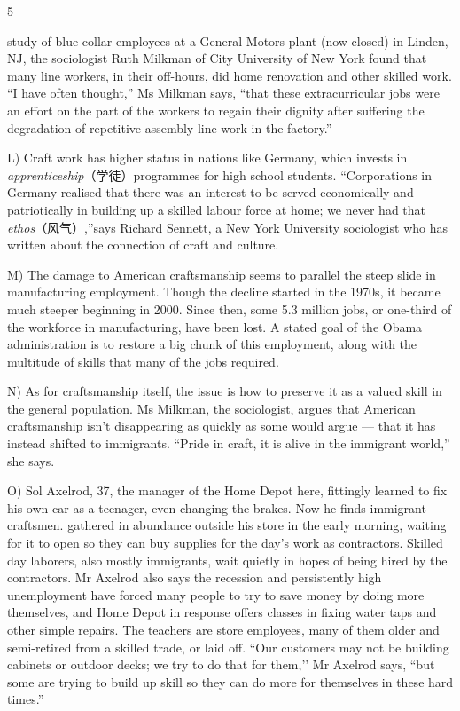 \documentclass[UTF8,11pt]{ctexart}
\begin{document}
5


study of blue-collar employees at a General Motors plant (now closed) in Linden, NJ, the sociologist Ruth Milkman of City University of New York found that many line workers, in their off-hours, did home renovation and other skilled work. “I have often thought,” Ms Milkman says, “that these extracurricular jobs were an effort on the part of the workers to regain their dignity after suffering the degradation of repetitive assembly line work in the factory.”


L) Craft work has higher status in nations like Germany, which invests in\textit{ apprenticeship}（学徒）programmes for high school students. “Corporations in Germany realised that there was an interest to be served economically and patriotically in building up a skilled labour force at home; we never had that\textit{ ethos}（风气）,”says Richard Sennett, a New York University sociologist who has written about the connection of craft and culture.


M) The damage to American craftsmanship seems to parallel the steep slide in manufacturing employment. Though the decline started in the 1970s, it became much steeper beginning in 2000. Since then, some 5.3 million jobs, or one-third of the workforce in manufacturing, have been lost. A stated goal of the Obama administration is to restore a big chunk of this employment, along with the multitude of skills that many of the jobs required.


N) As for craftsmanship itself, the issue is how to preserve it as a valued skill in the general population. Ms Milkman, the sociologist, argues that American craftsmanship isn’t disappearing as quickly as some would argue — that it has instead shifted to immigrants. “Pride in craft, it is alive in the immigrant world,” she says.


O) Sol Axelrod, 37, the manager of the Home Depot here, fittingly learned to fix his own car as a teenager, even changing the brakes. Now he finds immigrant craftsmen. gathered in abundance outside his store in the early morning, waiting for it to open so they can buy supplies for the day’s work as contractors. Skilled day laborers, also mostly immigrants, wait quietly in hopes of being hired by the contractors. Mr Axelrod also says the recession and persistently high unemployment have forced many people to try to save money by doing more themselves, and Home Depot in response offers classes in fixing water taps and other simple repairs. The teachers are store employees, many of them older and semi-retired from a skilled trade, or laid off. “Our customers may not be building cabinets or outdoor decks; we try to do that for them,’’ Mr Axelrod says, “but some are trying to build up skill so they can do more for themselves in these hard times.”
\end{document}
